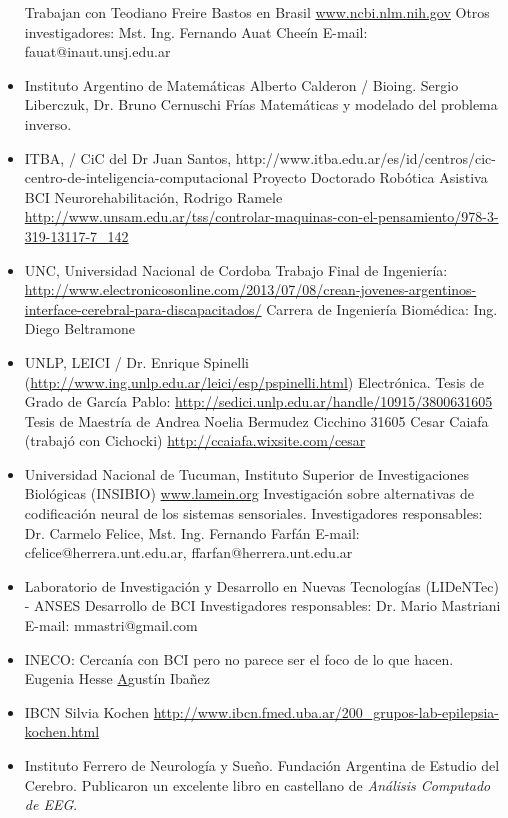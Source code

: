 \begin{itemize}
Trabajan con Teodiano Freire Bastos en Brasil
\url{www.ncbi.nlm.nih.gov}
Otros investigadores: Mst. Ing. Fernando Auat Cheeín
E-mail: fauat@inaut.unsj.edu.ar
\item Instituto Argentino de Matemáticas Alberto Calderon / Bioing. Sergio Liberczuk, Dr. Bruno Cernuschi Frías
Matemáticas y modelado del problema inverso.
\item ITBA, / CiC del Dr Juan Santos, http://www.itba.edu.ar/es/id/centros/cic-centro-de-inteligencia-computacional
Proyecto Doctorado Robótica Asistiva BCI Neurorehabilitación, Rodrigo Ramele
\url{http://www.unsam.edu.ar/tss/controlar-maquinas-con-el-pensamiento/978-3-319-13117-7_142}
\item UNC, Universidad Nacional de Cordoba
Trabajo Final de Ingeniería: \url{http://www.electronicosonline.com/2013/07/08/crean-jovenes-argentinos-interface-cerebral-para-discapacitados/}
Carrera de Ingeniería Biomédica: Ing. Diego Beltramone
\item UNLP, LEICI / Dr. Enrique Spinelli (\url{http://www.ing.unlp.edu.ar/leici/esp/pspinelli.html})
Electrónica.
Tesis de Grado de García Pablo: \url{http://sedici.unlp.edu.ar/handle/10915/3800631605}
Tesis de Maestría de Andrea Noelia Bermudez Cicchino 31605
Cesar Caiafa (trabajó con Cichocki) \url{http://ccaiafa.wixsite.com/cesar}
\item Universidad Nacional de Tucuman, Instituto Superior de Investigaciones Biológicas (INSIBIO)
\url{www.lamein.org}
Investigación sobre alternativas de codificación neural de los sistemas sensoriales.
Investigadores responsables: Dr. Carmelo Felice, Mst. Ing. Fernando Farfán
E-mail: cfelice@herrera.unt.edu.ar, ffarfan@herrera.unt.edu.ar
\item Laboratorio de Investigación y Desarrollo en Nuevas Tecnologías (LIDeNTec) - ANSES
Desarrollo de BCI
Investigadores responsables: Dr. Mario Mastriani
E-mail: mmastri@gmail.com
\item INECO: Cercanía con BCI pero no parece ser el foco de lo que hacen.
Eugenia Hesse \href{https://neuro.org.ar/sites/neuro.org.ar/files/Hesse-2015-Early%20detection%20of%20intentional%20harm.pdf}
Agustín Ibañez
\item  IBCN Silvia Kochen
\url{http://www.ibcn.fmed.uba.ar/200_grupos-lab-epilepsia-kochen.html}
\item Instituto Ferrero de Neurología y Sueño. Fundación Argentina de Estudio del Cerebro.
Publicaron un excelente libro en castellano de \textit{Análisis Computado de EEG}.

\end{itemize}